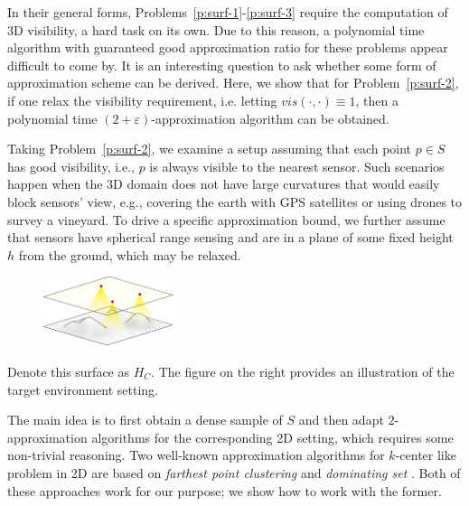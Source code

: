 
In their general forms, Problems~\ref{p:surf-1}-\ref{p:surf-3} require the computation of 3D visibility, a hard task on its own. Due to this reason, a polynomial time algorithm with guaranteed good approximation ratio for these problems appear difficult to come by. It is an interesting question to ask whether some form of approximation scheme can be derived. Here, we show that for Problem~\ref{p:surf-2}, if one relax the visibility requirement, i.e. letting $vis(\cdot, \cdot)\equiv 1$, then a polynomial time $(2+\varepsilon)$-approximation algorithm can be obtained. 

Taking Problem~\ref{p:surf-2}, we examine a setup assuming that each point $p \in S$ has good visibility, i.e., $p$ is always visible to the nearest sensor. Such scenarios happen when the 3D domain does not have large curvatures that would easily block sensors' view, e.g., covering the earth with GPS satellites or using drones to survey a vineyard. To drive a specific approximation bound, 
we further assume that sensors have spherical range sensing and are in a plane of some fixed height $h$ from the ground, which may be relaxed. 
\begin{figure}
  \includegraphics[width=1.5in]{chapters/surf/fig/env.png}
\end{figure}
Denote this surface as $H_C$. 
The figure on the right provides an illustration of the target environment setting. 

The main idea is to first obtain a dense sample of $S$ and then adapt $2$-approximation algorithms for the corresponding 2D setting, which requires some non-trivial reasoning. Two well-known approximation algorithms for $k$-center like problem in 2D are based on \emph{farthest point clustering} \cite{gonzalez1985clustering} and \emph{dominating set} \cite{hochbaum1985best, vazirani2013approximation}. Both of these approaches work for our purpose; we show how to work with the former.

